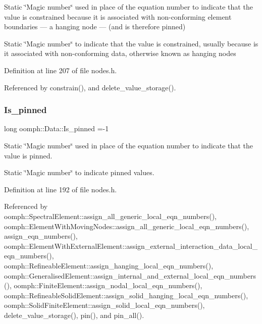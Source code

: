 Static \char`\"{}\+Magic number\char`\"{} used in place of the equation number to indicate that the value is constrained because it is associated with non-\/conforming element boundaries --- a hanging node --- (and is therefore pinned) 

Static \char`\"{}\+Magic number\char`\"{} to indicate that the value is constrained, usually because is it associated with non-\/conforming data, otherwise known as hanging nodes 

Definition at line 207 of file nodes.\+h.



Referenced by constrain(), and delete\+\_\+value\+\_\+storage().

\mbox{\label{classoomph_1_1Data_a3f351624d334f1babf55170d539b36fa}} 
\subsubsection{\texorpdfstring{Is\+\_\+pinned}{Is\_pinned}}
{\footnotesize\ttfamily long oomph\+::\+Data\+::\+Is\+\_\+pinned =-\/1\hspace{0.3cm}{\ttfamily [static]}}



Static \char`\"{}\+Magic number\char`\"{} used in place of the equation number to indicate that the value is pinned. 

Static \char`\"{}\+Magic number\char`\"{} to indicate pinned values. 

Definition at line 192 of file nodes.\+h.



Referenced by oomph\+::\+Spectral\+Element\+::assign\+\_\+all\+\_\+generic\+\_\+local\+\_\+eqn\+\_\+numbers(), oomph\+::\+Element\+With\+Moving\+Nodes\+::assign\+\_\+all\+\_\+generic\+\_\+local\+\_\+eqn\+\_\+numbers(), assign\+\_\+eqn\+\_\+numbers(), oomph\+::\+Element\+With\+External\+Element\+::assign\+\_\+external\+\_\+interaction\+\_\+data\+\_\+local\+\_\+eqn\+\_\+numbers(), oomph\+::\+Refineable\+Element\+::assign\+\_\+hanging\+\_\+local\+\_\+eqn\+\_\+numbers(), oomph\+::\+Generalised\+Element\+::assign\+\_\+internal\+\_\+and\+\_\+external\+\_\+local\+\_\+eqn\+\_\+numbers(), oomph\+::\+Finite\+Element\+::assign\+\_\+nodal\+\_\+local\+\_\+eqn\+\_\+numbers(), oomph\+::\+Refineable\+Solid\+Element\+::assign\+\_\+solid\+\_\+hanging\+\_\+local\+\_\+eqn\+\_\+numbers(), oomph\+::\+Solid\+Finite\+Element\+::assign\+\_\+solid\+\_\+local\+\_\+eqn\+\_\+numbers(), delete\+\_\+value\+\_\+storage(), pin(), and pin\+\_\+all().

